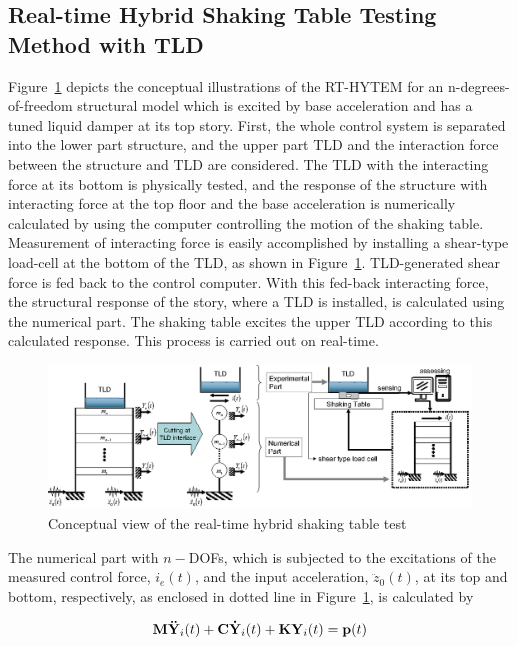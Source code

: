 \subsection{Real-time Hybrid Shaking Table Testing Method with TLD}
Figure~\ref{fig:3-1} depicts the conceptual illustrations of the RT-HYTEM for an n-degrees-of-freedom structural model which is excited by base acceleration and has a tuned liquid damper at its top story. First, the whole control system is separated into the lower part structure, and the upper part TLD and the interaction force between the structure and TLD are considered. The TLD with the interacting force at its bottom is physically tested, and the response of the structure with interacting force at the top floor and the base acceleration is numerically calculated by using the computer controlling the motion of the shaking table. Measurement of interacting force is easily accomplished by installing a shear-type load-cell at the bottom of the TLD, as shown in Figure~\ref{fig:3-1}. TLD-generated shear force is fed back to the control computer. With this fed-back interacting force, the structural response of the story, where a TLD is installed, is calculated using the numerical part. The shaking table excites the upper TLD according to this calculated response. This process is carried out on real-time.

\begin{figure}[ht]
\centering
\includegraphics[scale =1] {figure/3-1.eps}
\caption{Conceptual view of the real-time hybrid shaking table test}
\label{fig:3-1}
\end{figure}

The numerical part with $n-$DOFs, which is subjected to the excitations of the measured control force, $i_{e}(t)$, and the input acceleration, $\ddot{z}_{0}(t)$, at its top and bottom, respectively, as enclosed in dotted line in Figure~\ref{fig:3-1}, is calculated by

\begin{equation}\label{eq:3-1}
\mathbf{M}\mathbf{\ddot{Y}}_{i}(t) + \mathbf{C}\mathbf{\dot{Y}}_{i}(t) + \mathbf{K}\mathbf{Y}_{i}(t) = \mathbf{p}(t)
\end{equation}

